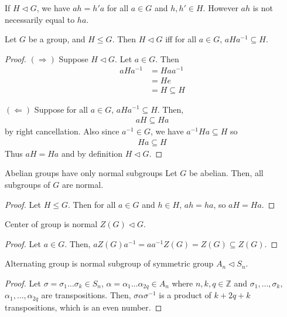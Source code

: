 \documentclass[12pt]{article}
\newcommand{\Z}{\mathbb{Z}}
\newcommand{\inv}{^{-1}}
\begin{document}
	\begin{myrem}{}{}
		If $H\lhd G$, we have $ah=h'a$ for all $a\in G$ and $h, h'\in H$. However $ah$ is not necessarily equal to $ha$.
	\end{myrem}
	
	\begin{mythm}{}{}
		Let $G$ be a group, and $H\leq G$. Then $H\lhd G$ iff for all $a\in G$, $aHa\inv\subseteq H$.
		\begin{proof}
			$(\Longrightarrow)$ Suppose $H\lhd G$. Let $a\in G$. Then
			\begin{align*}
				aHa\inv&=Haa\inv\\
				&=He\\
				&=H\subseteq H
			\end{align*}
			
			$(\Longleftarrow)$ Suppose for all $a\in G$, $aHa\inv\subseteq H$. Then,
			\begin{align*}
				aH\subseteq Ha
			\end{align*}
			by right cancellation. Also since $a\inv\in G$, we have $a\inv Ha\subseteq H$ so
			\begin{align*}
				Ha\subseteq H
			\end{align*}
			Thus $aH=Ha$ and by definition $H\lhd G$.
		\end{proof}
	\end{mythm}
	
	\begin{myex}{Abelian groups have only normal subgroups}{}
		Let $G$ be abelian. Then, all subgroups of $G$ are normal.
		\begin{proof}
			Let $H\leq G$. Then for all $a\in G$ and $h\in H$, $ah=ha$, so $aH=Ha$.
		\end{proof}
	\end{myex}
	
	\begin{myex}{Center of group is normal}{}
		$Z(G)\lhd G$.
		\begin{proof}
			Let $a\in G$. Then, $aZ(G)a\inv=aa\inv Z(G)=Z(G)\subseteq Z(G)$.
		\end{proof}
	\end{myex}
	
	\begin{myex}{Alternating group is normal subgroup of symmetric group}{}
		$A_n\lhd S_n$.
		\begin{proof}
			Let $\sigma=\sigma_1\dots\sigma_k\in S_n$, $\alpha=\alpha_1\dots\alpha_{2q}\in A_n$ where $n, k, q\in\Z$ and $\sigma_1, \dots, \sigma_{k},$ $\alpha_1, \dots, \alpha_{2q}$ are transpositions. Then, $\sigma\alpha\sigma\inv$ is a product of $k+2q+k$ transpositions, which is an even number.
		\end{proof}
	\end{myex}
	
\end{document}
